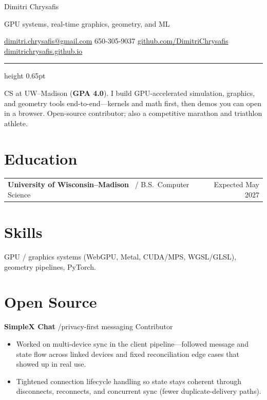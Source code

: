 \documentclass[10pt,letterpaper]{article}
\newcommand{\dotsep}{\hspace{0.4em}{\color{hair}\textperiodcentered}\hspace{0.4em}}
\newcommand{\job}[3]{%
  {\bodyfont\bfseries #1}%
  {\metafont\color{faint}\small\enskip/\enskip #2}%
  \hfill
  {\metafont\color{mid}\small #3}%
  \par\vspace{2.5pt}%
}
\begin{document}
\color{ink}

{\namefont\fontsize{27}{30}\selectfont Dimitri Chrysafis}

\vspace{4pt}
{\metafont\fontsize{9.5}{12}\selectfont\color{mid}%
  GPU systems, real-time graphics, geometry, and ML}

\vspace{7pt}
{\metafont\fontsize{9}{11}\selectfont\color{mid}%
  \href{mailto:dimitri.chrysafis@gmail.com}{dimitri.chrysafis@gmail.com}%
  \dotsep 650-305-9037%
  \dotsep \href{https://github.com/DimitriChrysafis}{github.com/DimitriChrysafis}%
  \dotsep \href{https://dimitrichrysafis.github.io/}{dimitrichrysafis.github.io}}

\vspace{9pt}
{\color{ink}\hrule height 0.65pt}
\vspace{9pt}

{\bodyfont\fontsize{9.7}{12.8}\selectfont
CS at UW--Madison (\textbf{GPA 4.0}). I build GPU-accelerated simulation, graphics, and geometry
tools end-to-end---kernels and math first, then demos you can open in a browser. Open-source
contributor; also a competitive marathon and triathlon athlete.}

\section*{Education}
{\bodyfont\fontsize{9.7}{12.2}\selectfont
\begin{tabularx}{\textwidth}{@{}Xr@{}}
  \textbf{University of Wisconsin--Madison}%
  {\color{faint}\metafont\ / \bodyfont} B.S.\ Computer Science
  & {\metafont\color{mid}\small Expected May 2027}\\
\end{tabularx}}

\section*{Skills}
{\bodyfont\fontsize{9.6}{12.4}\selectfont
GPU / graphics systems (WebGPU, Metal, CUDA/MPS, WGSL/GLSL), geometry pipelines, PyTorch.}

\section*{Open Source}
{\bodyfont\fontsize{9.6}{12.6}\selectfont
\job{SimpleX Chat}{privacy-first messaging}{Contributor}
\begin{itemize}
  \item Worked on multi-device sync in the client pipeline---followed message and state flow across linked devices and fixed reconciliation edge cases that showed up in real use.
  \item Tightened connection lifecycle handling so state stays coherent through disconnects, reconnects, and concurrent sync (fewer duplicate-delivery paths).
\end{itemize}}
\end{document}
